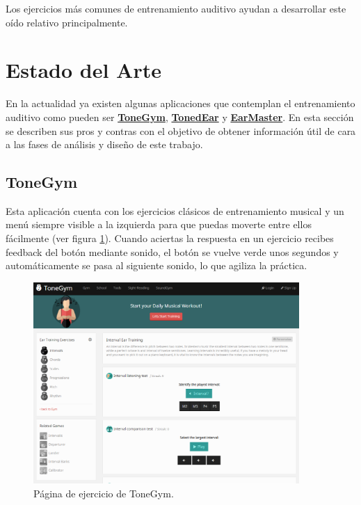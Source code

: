 \documentclass[12pt,twoside,titlepage]{report}
\begin{document}
Los ejercicios más comunes de entrenamiento auditivo ayudan a desarrollar este oído relativo principalmente.
\cite{oidoAbsRel}

\section{Estado del Arte}

En la actualidad ya existen algunas aplicaciones que contemplan el entrenamiento auditivo como pueden ser \hyperref[sec:ToneGym]{\textbf{ToneGym}}, \hyperref[sec:TonedEar]{\textbf{TonedEar}} y \hyperref[sec:EarMaster]{\textbf{EarMaster}}. En esta sección se describen sus pros y contras con el objetivo de obtener información útil de cara a las fases de análisis y diseño de este trabajo.

\subsection{ToneGym}
\label{sec:ToneGym}

Esta aplicación cuenta con los ejercicios clásicos de entrenamiento musical y un menú siempre visible a la izquierda para que puedas moverte entre ellos fácilmente (ver figura \ref{fig:ToneGym}). Cuando aciertas la respuesta en un ejercicio recibes feedback del botón mediante sonido, el botón se vuelve verde unos segundos y automáticamente se pasa al siguiente sonido, lo que agiliza la práctica.
\cite{tonegym1}

\begin{figure}[H] 
    \includegraphics[width=0.9\textwidth]{Estado del Arte/tonegym}
    \centering
    \caption{Página de ejercicio de ToneGym.}
    \label{fig:ToneGym}
\end{figure}
\end{document}
